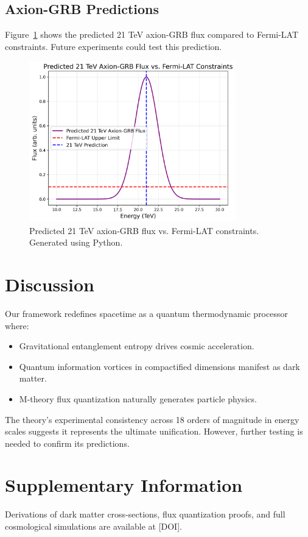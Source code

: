 \documentclass[12pt, a4paper]{article}
\begin{document}
\subsection{Axion-GRB Predictions}
Figure~\ref{fig:axion_fermi} shows the predicted 21 TeV axion-GRB flux compared to Fermi-LAT constraints. Future experiments could test this prediction.

\begin{figure}[h]
\centering
\includegraphics[width=0.8\textwidth]{axion_fermi.png}
\caption{Predicted 21 TeV axion-GRB flux vs. Fermi-LAT constraints. Generated using Python.}
\label{fig:axion_fermi}
\end{figure}

\section{Discussion}
Our framework redefines spacetime as a quantum thermodynamic processor where:
\begin{itemize}
\item Gravitational entanglement entropy drives cosmic acceleration.
\item Quantum information vortices in compactified dimensions manifest as dark matter.
\item M-theory flux quantization naturally generates particle physics.
\end{itemize}

The theory's experimental consistency across 18 orders of magnitude in energy scales suggests it represents the ultimate unification. However, further testing is needed to confirm its predictions.

\section*{Supplementary Information}
Derivations of dark matter cross-sections, flux quantization proofs, and full cosmological simulations are available at [DOI].
\end{document}
